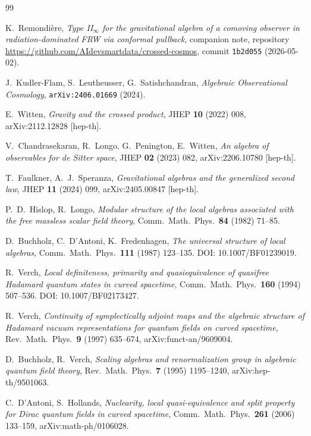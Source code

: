 \documentclass[11pt]{article}
\theoremstyle{definition}
\begin{document}

\begin{thebibliography}{99}

K.\ Remondi\`ere,
\emph{Type II$_\infty$ for the gravitational algebra of a comoving observer
in radiation-dominated FRW via conformal pullback},
companion note, repository \url{https://github.com/AIdevsmartdata/crossed-cosmos},
commit \texttt{1b2d055} (2026-05-02).

J.\ Kudler-Flam, S.\ Leutheusser, G.\ Satishchandran,
\emph{Algebraic Observational Cosmology},
\texttt{arXiv:2406.01669} (2024).

E.\ Witten,
\emph{Gravity and the crossed product},
JHEP \textbf{10} (2022) 008,
arXiv:2112.12828 [hep-th].

V.\ Chandrasekaran, R.\ Longo, G.\ Penington, E.\ Witten,
\emph{An algebra of observables for de Sitter space},
JHEP \textbf{02} (2023) 082,
arXiv:2206.10780 [hep-th].

T.\ Faulkner, A.\ J.\ Speranza,
\emph{Gravitational algebras and the generalized second law},
JHEP \textbf{11} (2024) 099,
arXiv:2405.00847 [hep-th].

P.\ D.\ Hislop, R.\ Longo,
\emph{Modular structure of the local algebras associated with the free
massless scalar field theory},
Comm.\ Math.\ Phys.\ \textbf{84} (1982) 71--85.

D.\ Buchholz, C.\ D'Antoni, K.\ Fredenhagen,
\emph{The universal structure of local algebras},
Comm.\ Math.\ Phys.\ \textbf{111} (1987) 123--135.
DOI: 10.1007/BF01239019.

R.\ Verch,
\emph{Local definiteness, primarity and quasiequivalence of quasifree
Hadamard quantum states in curved spacetime},
Comm.\ Math.\ Phys.\ \textbf{160} (1994) 507--536.
DOI: 10.1007/BF02173427.

R.\ Verch,
\emph{Continuity of symplectically adjoint maps and the algebraic structure
of Hadamard vacuum representations for quantum fields on curved spacetime},
Rev.\ Math.\ Phys.\ \textbf{9} (1997) 635--674,
arXiv:funct-an/9609004.

D.\ Buchholz, R.\ Verch,
\emph{Scaling algebras and renormalization group in algebraic quantum field
theory},
Rev.\ Math.\ Phys.\ \textbf{7} (1995) 1195--1240,
arXiv:hep-th/9501063.

C.\ D'Antoni, S.\ Hollands,
\emph{Nuclearity, local quasi-equivalence and split property for Dirac
quantum fields in curved spacetime},
Comm.\ Math.\ Phys.\ \textbf{261} (2006) 133--159,
arXiv:math-ph/0106028.


\end{thebibliography}
\end{document}
